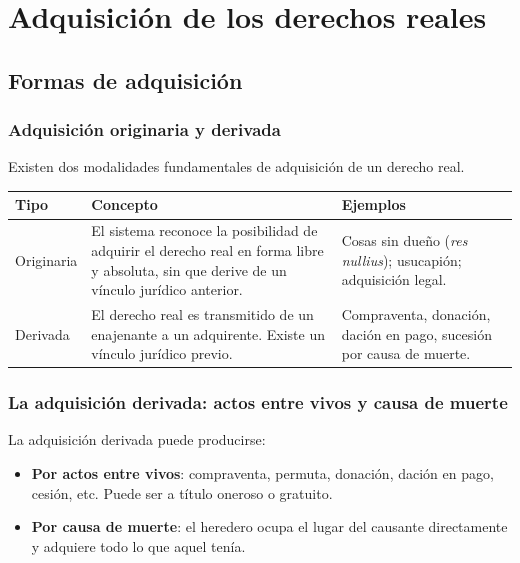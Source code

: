 \documentclass[12pt,oneside]{book}
\begin{document}
\chapter[Adquisición de los derechos reales]{Adquisición de los derechos reales}

\section{Formas de adquisición}

\subsection{Adquisición originaria y derivada}

Existen dos modalidades fundamentales de adquisición de un derecho real.

\begin{center}
\small
\renewcommand{\arraystretch}{1.3}
\begin{tabularx}{\textwidth}{@{}>{\raggedright\arraybackslash}p{}>{\raggedright\arraybackslash}X>{\raggedright\arraybackslash}p{}@{}}
\toprule
\textbf{Tipo} & \textbf{Concepto} & \textbf{Ejemplos} \\
\midrule
Originaria & El sistema reconoce la posibilidad de adquirir el derecho real en forma libre y absoluta, sin que derive de un vínculo jurídico anterior. & Cosas sin dueño (\textit{res nullius}); usucapión; adquisición legal. \\
Derivada & El derecho real es transmitido de un enajenante a un adquirente. Existe un vínculo jurídico previo. & Compraventa, donación, dación en pago, sucesión por causa de muerte. \\
\bottomrule
\end{tabularx}
\end{center}

\subsection{La adquisición derivada: actos entre vivos y causa de muerte}

La adquisición derivada puede producirse:

\begin{itemize}
    \item \textbf{Por actos entre vivos}: compraventa, permuta, donación, dación en pago, cesión, etc. Puede ser a título oneroso o gratuito.
    \item \textbf{Por causa de muerte}: el heredero ocupa el lugar del causante directamente y adquiere todo lo que aquel tenía.
\end{itemize}
\end{document}
